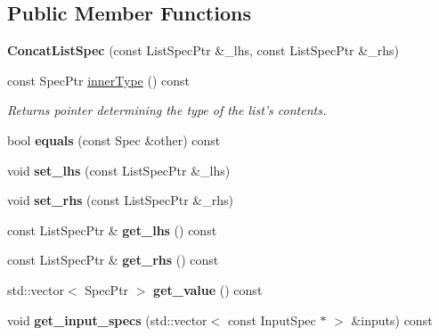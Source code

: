 \subsection*{Public Member Functions}
\begin{DoxyCompactItemize}
\item 
\hypertarget{classgiskard__suturo_1_1ConcatListSpec_a7c8f8282724b87929570412fb549c2e5}{{\bfseries Concat\-List\-Spec} (const List\-Spec\-Ptr \&\-\_\-lhs, const List\-Spec\-Ptr \&\-\_\-rhs)}\label{classgiskard__suturo_1_1ConcatListSpec_a7c8f8282724b87929570412fb549c2e5}

\item 
const Spec\-Ptr \hyperlink{classgiskard__suturo_1_1ConcatListSpec_ab4c15638659af22f9bfc4676e4e7b399}{inner\-Type} () const 
\begin{DoxyCompactList}\small\item\em Returns pointer determining the type of the list's contents. \end{DoxyCompactList}\item 
\hypertarget{classgiskard__suturo_1_1ConcatListSpec_acaaf348a330e3f86b51f098bbd7a973a}{bool {\bfseries equals} (const Spec \&other) const }\label{classgiskard__suturo_1_1ConcatListSpec_acaaf348a330e3f86b51f098bbd7a973a}

\item 
\hypertarget{classgiskard__suturo_1_1ConcatListSpec_aef3425780757d93d5b6ad666643c45f0}{void {\bfseries set\-\_\-lhs} (const List\-Spec\-Ptr \&\-\_\-lhs)}\label{classgiskard__suturo_1_1ConcatListSpec_aef3425780757d93d5b6ad666643c45f0}

\item 
\hypertarget{classgiskard__suturo_1_1ConcatListSpec_ac1245b7bf9645ead2c6021b0faa753a0}{void {\bfseries set\-\_\-rhs} (const List\-Spec\-Ptr \&\-\_\-rhs)}\label{classgiskard__suturo_1_1ConcatListSpec_ac1245b7bf9645ead2c6021b0faa753a0}

\item 
\hypertarget{classgiskard__suturo_1_1ConcatListSpec_a0a6773bd81f475f01412f73f478b2d77}{const List\-Spec\-Ptr \& {\bfseries get\-\_\-lhs} () const }\label{classgiskard__suturo_1_1ConcatListSpec_a0a6773bd81f475f01412f73f478b2d77}

\item 
\hypertarget{classgiskard__suturo_1_1ConcatListSpec_a3f2e02bf25953434a90f00139b3294c9}{const List\-Spec\-Ptr \& {\bfseries get\-\_\-rhs} () const }\label{classgiskard__suturo_1_1ConcatListSpec_a3f2e02bf25953434a90f00139b3294c9}

\item 
\hypertarget{classgiskard__suturo_1_1ConcatListSpec_a4fa8c3dd54a310d0b99e823330847b6b}{std\-::vector$<$ Spec\-Ptr $>$ {\bfseries get\-\_\-value} () const }\label{classgiskard__suturo_1_1ConcatListSpec_a4fa8c3dd54a310d0b99e823330847b6b}

\item 
\hypertarget{classgiskard__suturo_1_1ConcatListSpec_a386b7b02523ef77bb6c1c2ad688ea09d}{void {\bfseries get\-\_\-input\-\_\-specs} (std\-::vector$<$ const Input\-Spec $\ast$ $>$ \&inputs) const }\label{classgiskard__suturo_1_1ConcatListSpec_a386b7b02523ef77bb6c1c2ad688ea09d}

\end{DoxyCompactItemize}
